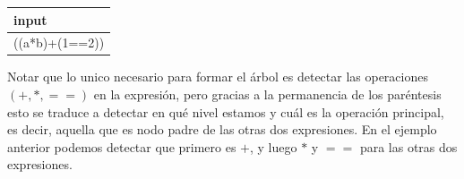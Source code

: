 \documentclass[letterpaper,10pt,table, dvipsnames]{article}
\begin{document}
\begin{table}[H]
\centering
\begin{minipage}[b]{0.2\linewidth}
\begin{tabular}{|l|}
    \hline
    input \\
    \hline\hline
    ((a*b)+(1==2)) \\
    \hline
    \end{tabular}%
\end{minipage}
\hspace{0.3cm} %
\begin{minipage}[h]{0.05\linewidth}       %
\end{minipage}                  %
\hspace{0.5cm} %
\begin{minipage}[h]{0.1\linewidth}
\end{minipage}
\hspace{0.5cm} %
\begin{minipage}[h]{0.05\linewidth}       %
\end{minipage}                  %
\hspace{0.3cm} %
\begin{minipage}[h]{0.3\linewidth}
\end{minipage}
\end{table}

Notar que lo unico necesario para formar el árbol es detectar las operaciones $(+,*,==)$ en la expresión, pero gracias a la permanencia de los paréntesis esto se traduce a detectar en qué nivel estamos y cuál es la operación principal, es decir, aquella que es nodo padre de las otras dos expresiones. En el ejemplo anterior podemos detectar que primero es $+$, y luego $*$ y $==$ para las otras dos expresiones.\\
\end{document}
